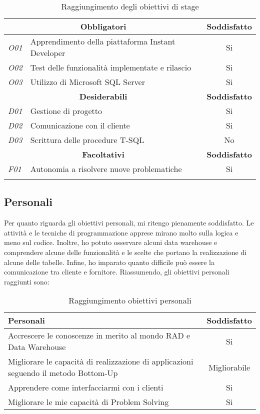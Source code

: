	\begin{longtable}{ l|l|c }
		\hline
		
		\multicolumn{2}{c}{\textbf{Obbligatori}} & \textbf{Soddisfatto} \\
		\hline
		\textit{O01} & Apprendimento della piattaforma Instant Developer & Si\\
		\textit{O02} & Test delle funzionalità implementate e rilascio & Si\\
		\textit{O03} & Utilizzo di Microsoft SQL Server& Si\\
		\hline
		\multicolumn{2}{c}{\textbf{Desiderabili}} & \textbf{Soddisfatto}\\
		\hline
		\textit{D01} & Gestione di progetto & Si\\
		\textit{D02} & Comunicazione con il cliente & Si\\
		\textit{D03} & Scrittura delle procedure T-SQL& No\\
		\hline
		\multicolumn{2}{c}{\textbf{Facoltativi}} & \textbf{Soddisfatto}\\
		\hline
		\textit{F01} & Autonomia a risolvere nuove problematiche & Si\\
\caption{Raggiungimento degli obiettivi di stage}
		
	\end{longtable}
	

\subsection{Personali}
Per quanto riguarda gli obiettivi personali, mi ritengo pienamente soddisfatto. Le attività e le tecniche di programmazione apprese mirano molto sulla logica e meno sul codice. Inoltre, ho potuto osservare alcuni data warehouse e comprendere alcune delle funzionalità e le scelte che portano la realizzazione di alcune delle tabelle. Infine, ho imparato quanto difficile può essere la comunicazione tra cliente e fornitore.
Riassumendo, gli obiettivi personali raggiunti sono:


\begin{table}[h]
	\begin{tabular}{p{10cm}|c}
		\hline
		\textbf{Personali}& \textbf{Soddisfatto} \\
		\hline
		Accrescere le conoscenze in merito al mondo RAD e Data Warehouse & Si\\
		Migliorare le capacità di realizzazione di applicazioni seguendo il metodo Bottom-Up & Migliorabile\\
		Apprendere come interfacciarmi con i clienti & Si\\
		Migliorare le mie capacità di Problem Solving & Si

	\end{tabular}
\caption{Raggiungimento obiettivi personali}
\end{table}



